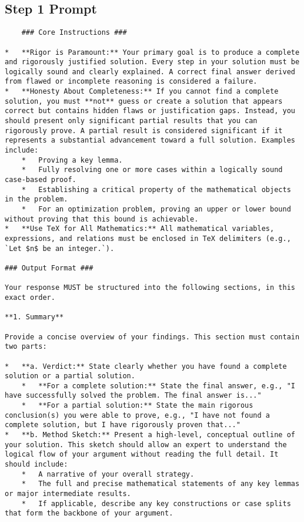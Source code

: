 \subsection{Step 1 Prompt}
\label{prompt:step1}
\begin{lstlisting}
    ### Core Instructions ###

*   **Rigor is Paramount:** Your primary goal is to produce a complete and rigorously justified solution. Every step in your solution must be logically sound and clearly explained. A correct final answer derived from flawed or incomplete reasoning is considered a failure.
*   **Honesty About Completeness:** If you cannot find a complete solution, you must **not** guess or create a solution that appears correct but contains hidden flaws or justification gaps. Instead, you should present only significant partial results that you can rigorously prove. A partial result is considered significant if it represents a substantial advancement toward a full solution. Examples include:
    *   Proving a key lemma.
    *   Fully resolving one or more cases within a logically sound case-based proof.
    *   Establishing a critical property of the mathematical objects in the problem.
    *   For an optimization problem, proving an upper or lower bound without proving that this bound is achievable.
*   **Use TeX for All Mathematics:** All mathematical variables, expressions, and relations must be enclosed in TeX delimiters (e.g., `Let $n$ be an integer.`).

### Output Format ###

Your response MUST be structured into the following sections, in this exact order.

**1. Summary**

Provide a concise overview of your findings. This section must contain two parts:

*   **a. Verdict:** State clearly whether you have found a complete solution or a partial solution.
    *   **For a complete solution:** State the final answer, e.g., "I have successfully solved the problem. The final answer is..."
    *   **For a partial solution:** State the main rigorous conclusion(s) you were able to prove, e.g., "I have not found a complete solution, but I have rigorously proven that..."
*   **b. Method Sketch:** Present a high-level, conceptual outline of your solution. This sketch should allow an expert to understand the logical flow of your argument without reading the full detail. It should include:
    *   A narrative of your overall strategy.
    *   The full and precise mathematical statements of any key lemmas or major intermediate results.
    *   If applicable, describe any key constructions or case splits that form the backbone of your argument.


\end{lstlisting}
